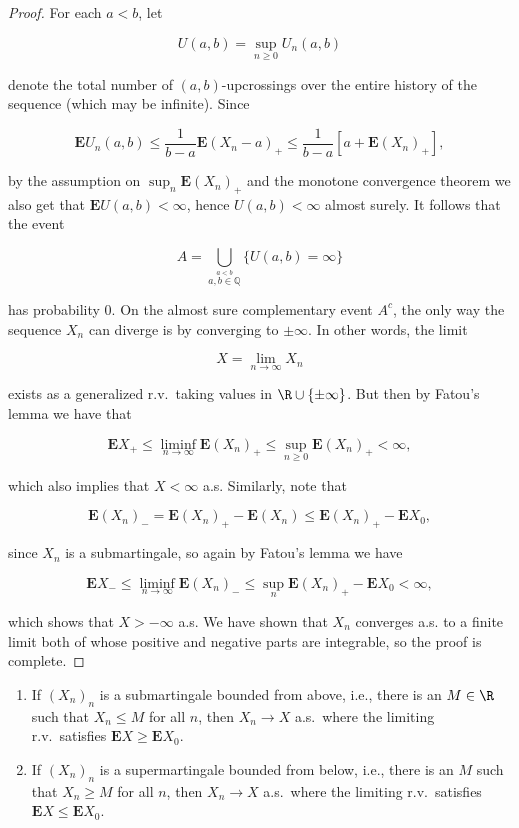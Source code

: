 \begin{proof}
For each $a<b$, let

\[
U(a,b) = \sup_{n\ge0} U_n(a,b)
\]

\noindent denote the total number of $(a,b)$-upcrossings over
the entire history of the sequence (which may be
infinite). Since

\[
\mathbf{E} U_n(a,b) \le \frac{1}{b-a} \mathbf{E}(X_n-a)_+ \le \frac{1}{b-a} \left[ a + \mathbf{E} (X_n)_+ \right],
\]

\noindent by the assumption on $\sup_n \mathbf{E}(X_n)_+$ and
the monotone convergence theorem we also get that
$\mathbf{E} U(a,b) < \infty$, hence $U(a,b)<\infty$
almost surely. It follows that the event

\[
A = \bigcup_{\stackrel{a<b}{a,b\in\mathbb{Q}}} \{ U(a,b) = \infty \}
\]

\noindent has probability $0$. On the almost sure complementary
event $A^c$, the only way the sequence $X_n$ can
diverge is by converging to $\pm \infty$. In other
words, the limit

\[
X = \lim_{n\to\infty} X_n
\]

\noindent exists as a generalized r.v.\ taking values in
$\R\cup\{\pm\infty\}$. But then by Fatou's lemma we
have that

\[
\mathbf{E} X_+ \le \liminf_{n\to\infty} \mathbf{E} (X_n)_+ \le \sup_{n\ge 0} \mathbf{E}(X_n)_+ < \infty,
\]

\noindent which also implies that $X<\infty$ a.s. Similarly,
note that

\[
\mathbf{E} (X_n)_- = \mathbf{E} (X_n)_+ - \mathbf{E}(X_n) \le \mathbf{E} (X_n)_+ - \mathbf{E} X_0,
\]

\noindent since $X_n$ is a submartingale, so again by Fatou's
lemma we have

\[
\mathbf{E} X_- \le \liminf_{n\to\infty} \mathbf{E} (X_n)_- \le \sup_n \mathbf{E}(X_n)_+ - \mathbf{E} X_0 < \infty,
\]

\noindent which shows that $X>-\infty$ a.s. We have shown that
$X_n$ converges a.s. to a finite limit both of whose
positive and negative parts are integrable, so the
proof is complete.
\end{proof}

\begin{cor}
\label{mart-conv-cor}

\begin{enumerate}[label=\arabic*.]
\item If $(X_n)_n$ is a submartingale bounded from above,
i.e., there is an $M\in\R$ such that $X_n\le M$ for
all $n$, then $X_n\to X$ a.s.\ where the limiting
r.v.\ satisfies $\mathbf{E} X \ge \mathbf{E} X_0$.

\item If $(X_n)_n$ is a supermartingale bounded from below,
i.e., there is an $M$ such that $X_n\ge M$ for all
$n$, then $X_n\to X$ a.s.\ where the limiting r.v.\
satisfies $\mathbf{E} X \le \mathbf{E} X_0$.
\end{enumerate}

\end{cor}

